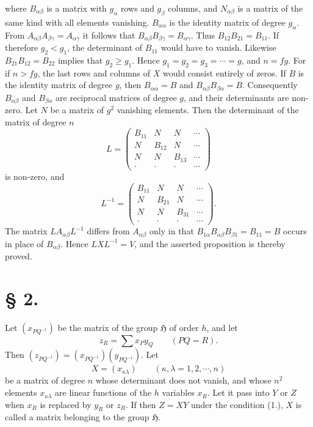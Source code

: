 \documentclass[11pt]{article}
\newcommand{\Hgr}{\mathfrak{H}}
\begin{document}
where $B_{\alpha\beta}$ is a matrix with $g_\alpha$ rows and $g_\beta$ columns, and $N_{\alpha\beta}$ is a matrix of the same kind with all elements vanishing. $B_{\alpha\alpha}$ is the identity matrix of degree $g_\alpha$. From $A_{\alpha\beta}A_{\beta\gamma}=A_{\alpha\gamma}$ it follows that $B_{\alpha\beta}B_{\beta\gamma}=B_{\alpha\gamma}$. Thus $B_{12}B_{21}=B_{11}$. If therefore $g_2<g_1$, the determinant of $B_{11}$ would have to vanish. Likewise $B_{21}B_{12}=B_{22}$ implies that $g_2\geq g_1$. Hence $g_1=g_2=g_3=\cdots=g$, and $n=fg$. For if $n>fg$, the last rows and columns of $X$ would consist entirely of zeros. If $B$ is the identity matrix of degree $g$, then $B_{\alpha\alpha}=B$ and $B_{\alpha\beta}B_{\beta\alpha}=B$. Consequently $B_{\alpha\beta}$ and $B_{\beta\alpha}$ are reciprocal matrices of degree $g$, and their determinants are non-zero. Let $N$ be a matrix of $g^2$ vanishing elements. Then the determinant of the matrix of degree $n$
\[
L=\begin{pmatrix}
B_{11}&N&N&\cdots\\
N&B_{12}&N&\cdots\\
N&N&B_{13}&\cdots\\
\cdot&\cdot&\cdot&\cdots
\end{pmatrix}
\]
is non-zero, and
\[
L^{-1}=\begin{pmatrix}
B_{11}&N&N&\cdots\\
N&B_{21}&N&\cdots\\
N&N&B_{31}&\cdots\\
\cdot&\cdot&\cdot&\cdots
\end{pmatrix}.
\]
The matrix $LA_{\alpha\beta}L^{-1}$ differs from $A_{\alpha\beta}$ only in that $B_{1\alpha}B_{\alpha\beta}B_{\beta1}=B_{11}=B$ occurs in place of $B_{\alpha\beta}$. Hence $LXL^{-1}=V$, and the asserted proposition is thereby proved.

\section*{§ 2.}

Let $(x_{PQ^{-1}})$ be the matrix of the group $\Hgr$ of order $h$, and let
\begin{equation}\tag{1.}
z_R=\sum x_Py_Q\qquad(PQ=R).
\end{equation}
Then $(z_{PQ^{-1}})=(x_{PQ^{-1}})(y_{PQ^{-1}})$. Let
\[
X=(x_{\kappa\lambda})\qquad(\kappa,\lambda=1,2,\cdots,n)
\]
be a matrix of degree $n$ whose determinant does not vanish, and whose $n^2$ elements $x_{\kappa\lambda}$ are linear functions of the $h$ variables $x_R$. Let it pass into $Y$ or $Z$ when $x_R$ is replaced by $y_R$ or $z_R$. If then $Z=XY$ under the condition (1.), $X$ is called a matrix belonging to the group $\Hgr$.
\end{document}
